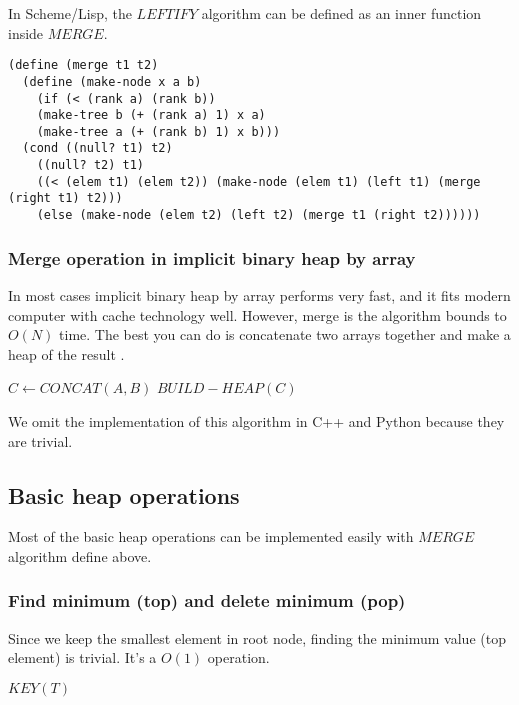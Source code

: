 \documentclass{article}
\begin{document}
In Scheme/Lisp, the $LEFTIFY$ algorithm can be defined as an
inner function inside $MERGE$.

\lstset{language=lisp}
\begin{lstlisting}
(define (merge t1 t2)
  (define (make-node x a b)
    (if (< (rank a) (rank b))
	(make-tree b (+ (rank a) 1) x a)
	(make-tree a (+ (rank b) 1) x b)))
  (cond ((null? t1) t2)
	((null? t2) t1)
	((< (elem t1) (elem t2)) (make-node (elem t1) (left t1) (merge (right t1) t2)))
	(else (make-node (elem t2) (left t2) (merge t1 (right t2))))))
\end{lstlisting}

\subsubsection{Merge operation in implicit binary heap by array}

In most cases implicit binary heap by array performs very fast, and
it fits modern computer with cache technology well. However, merge
is the algorithm bounds to $O(N)$ time. The best you can do is 
concatenate two arrays together and make a heap of the result \cite{NIST}.

\begin{algorithmic}[1]
  $C \gets CONCAT(A, B)$
  $BUILD-HEAP(C)$
\EndFunction
\end{algorithmic}

We omit the implementation of this algorithm in C++ and Python because 
they are trivial.

\subsection{Basic heap operations}

Most of the basic heap operations can be implemented easily with $MERGE$
algorithm define above.

\subsubsection{Find minimum (top) and delete minimum (pop)}
Since we keep the smallest element in root node, finding the minimum
value (top element) is trivial. It's a $O(1)$ operation.

\begin{algorithmic}[1]
  \State \Return $KEY(T)$
\EndFunction
\end{algorithmic}
\end{document}
